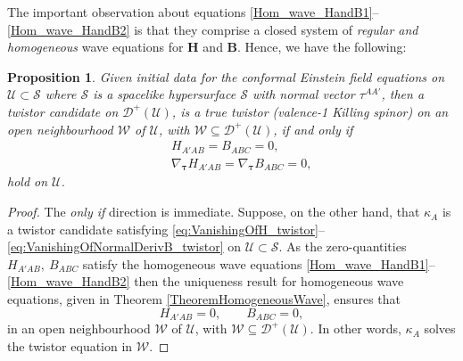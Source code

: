 \documentclass[10pt,a4paper]{article}
\theoremstyle{plain}
\newtheorem{proposition}{Proposition}
\def\bmB{{\bm B}}
\def\bmH{{\bm H}}
\begin{document}
The important observation about equations
\eqref{Hom_wave_HandB1}--\eqref{Hom_wave_HandB2} is that they comprise
a closed system of \emph{regular and homogeneous} wave equations for
$\bmH$ and $\bmB$. Hence, we have the following:
\begin{proposition}\label{Prop:Propagation_twistor}
  Given initial data for the conformal Einstein field equations on
  $\mathcal{U}\subset\mathcal{S}$ where $\mathcal{S}$ is a spacelike
  hypersurface $\mathcal{S}$ with normal vector $\tau^{AA'}$, then a
  twistor candidate on $\mathcal{D}^{+}(\mathcal{U})$, is a true
  twistor (valence-1 Killing spinor) on an open neighbourhood
  $\mathcal{W}$ of $\mathcal{U}$, with
  $\mathcal{W}\subseteq\mathcal{D}^{+}(\mathcal{U})$, if and only if
\begin{subequations}
\begin{eqnarray}
  &&
  H_{A'AB}=B_{ABC}=0,\label{eq:VanishingOfH_twistor}\\ &&\nabla_{\bm\tau}H_{A'AB}=\nabla_{\bm\tau}
  B_{ABC}=0, \label{eq:VanishingOfNormalDerivB_twistor}
\end{eqnarray}
\end{subequations}
hold on $\mathcal{U}$.
\end{proposition}
\begin{proof}
The \emph{only if} direction is immediate. Suppose, on the other hand,
that $\kappa_A$ is a twistor candidate satisfying
\eqref{eq:VanishingOfH_twistor}--\eqref{eq:VanishingOfNormalDerivB_twistor}
on $\mathcal{U}\subset\mathcal{S}$.  As the zero-quantities
$H_{A'AB},~B_{ABC}$ satisfy the homogeneous wave equations
\eqref{Hom_wave_HandB1}--\eqref{Hom_wave_HandB2} then the uniqueness
result for homogeneous wave equations, given in Theorem
\ref{TheoremHomogeneousWave}, ensures that
\[ H_{A'AB}=0,\qquad B_{ABC}=0,\]
in an open neighbourhood $\mathcal{W}$ of $\mathcal{U}$, with
$\mathcal{W}\subseteq\mathcal{D}^{+}(\mathcal{U})$.  In other words, $\kappa_{A}$
solves the twistor equation in $\mathcal{W}$.
\end{proof}
\end{document}
